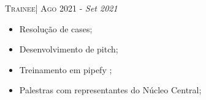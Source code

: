 \begin{framed}
         \textsc{Trainee}| \textsc{Ago 2021} - \emph{Set 2021}                             
          \small{

            \begin{itemize}[leftmargin=*]
                \item Resolução de cases;
                \item Desenvolvimento de pitch;
                \item Treinamento em pipefy ;
                \item Palestras com representantes do Núcleo Central;
            \end{itemize}

        }                                                                                         
\end{framed}